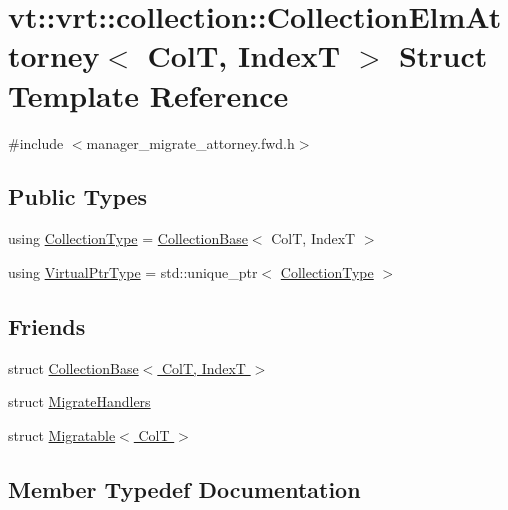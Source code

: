 \hypertarget{structvt_1_1vrt_1_1collection_1_1_collection_elm_attorney}{}\section{vt\+:\+:vrt\+:\+:collection\+:\+:Collection\+Elm\+Attorney$<$ ColT, IndexT $>$ Struct Template Reference}
\label{structvt_1_1vrt_1_1collection_1_1_collection_elm_attorney}


{\ttfamily \#include $<$manager\+\_\+migrate\+\_\+attorney.\+fwd.\+h$>$}

\subsection*{Public Types}
\begin{DoxyCompactItemize}
\item 
using \hyperlink{structvt_1_1vrt_1_1collection_1_1_collection_elm_attorney_a72d0076f73ac093f85ba5910337c6d02}{Collection\+Type} = \hyperlink{structvt_1_1vrt_1_1collection_1_1_collection_base}{Collection\+Base}$<$ ColT, IndexT $>$
\item 
using \hyperlink{structvt_1_1vrt_1_1collection_1_1_collection_elm_attorney_a36fe2c7f590baec1038c592db59a6315}{Virtual\+Ptr\+Type} = std\+::unique\+\_\+ptr$<$ \hyperlink{structvt_1_1vrt_1_1collection_1_1_collection_elm_attorney_a72d0076f73ac093f85ba5910337c6d02}{Collection\+Type} $>$
\end{DoxyCompactItemize}
\subsection*{Friends}
\begin{DoxyCompactItemize}
\item 
struct \hyperlink{structvt_1_1vrt_1_1collection_1_1_collection_elm_attorney_a4fb39ed9be2f0de84b237088ececde3f}{Collection\+Base$<$ Col\+T, Index\+T $>$}
\item 
struct \hyperlink{structvt_1_1vrt_1_1collection_1_1_collection_elm_attorney_af2ee449d95081faa04ebc6b8ae6516ed}{Migrate\+Handlers}
\item 
struct \hyperlink{structvt_1_1vrt_1_1collection_1_1_collection_elm_attorney_a84862bfff2c5474deebea7c6cb8511a7}{Migratable$<$ Col\+T $>$}
\end{DoxyCompactItemize}


\subsection{Member Typedef Documentation}
\mbox{\label{structvt_1_1vrt_1_1collection_1_1_collection_elm_attorney_a72d0076f73ac093f85ba5910337c6d02}} 
